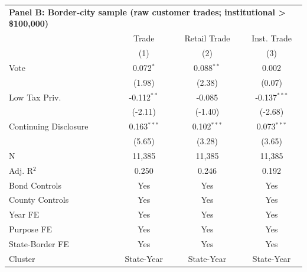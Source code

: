 \begingroup
\centering
\begin{tabular*}{\textwidth}{@{\extracolsep{\fill}}lccc}
\multicolumn{5}{l}{\textbf{Panel B: Border-city sample (raw customer trades; institutional > \$100,000)}}\\

\addlinespace
   \toprule
                         & Trade         & Retail Trade  & Inst. Trade\\  
                         & (1)           & (2)           & (3)\\  
   \midrule 
   Vote                  & 0.072$^{*}$   & 0.088$^{**}$  & 0.002\\   
                         & (1.98)       & (2.38)       & (0.07)\\   
   Low Tax Priv.         & -0.112$^{**}$ & -0.085        & -0.137$^{***}$\\   
                         & (-2.11)      & (-1.40)      & (-2.68)\\   
   Continuing Disclosure & 0.163$^{***}$ & 0.102$^{***}$ & 0.073$^{***}$\\   
                         & (5.65)       & (3.28)       & (3.65)\\   
   \hline
   N          & 11,385        & 11,385        & 11,385\\  
   Adj. R$^2$        & 0.250         & 0.246         & 0.192\\  
   Bond Controls         & Yes           & Yes           & Yes\\  
   County Controls       & Yes           & Yes           & Yes\\  
   Year FE               & Yes           & Yes           & Yes\\  
   Purpose FE            & Yes           & Yes           & Yes\\  
   State-Border FE       & Yes           & Yes           & Yes\\  
   Cluster              & State-Year & State-Year & State-Year\\  
   \bottomrule
\end{tabular*}
\par\endgroup
